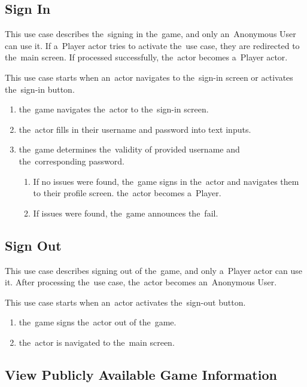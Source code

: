 \subsection{Sign In}

This use case describes the~signing in the~game, and only an~Anonymous User can use it. If a~Player actor tries to activate the~use case, they are redirected to the~main screen.
If processed successfully, the~actor becomes a~Player actor.

This use case starts when an~actor navigates to the~sign-in screen or activates the~sign-in button.

\begin{enumerate}
    \item the~game navigates the~actor to the~sign-in screen.
    \item the~actor fills in their username and password into text inputs.
    \item the~game determines the~validity of provided username and the~corresponding password.
    \begin{enumerate}
        \item If no issues were found, the~game signs in the~actor and navigates them to their profile screen. the~actor becomes a~Player.
        \item If issues were found, the~game announces the~fail.
    \end{enumerate}
\end{enumerate}

\subsection{Sign Out}

This use case describes signing out of the~game, and only a~Player actor can use it.
After processing the~use case, the~actor becomes an~Anonymous User.

This use case starts when an~actor activates the~sign-out button.

\begin{enumerate}
    \item the~game signs the~actor out of the~game.
    \item the~actor is navigated to the~main screen.
\end{enumerate}

\subsection{View Publicly Available Game Information}

